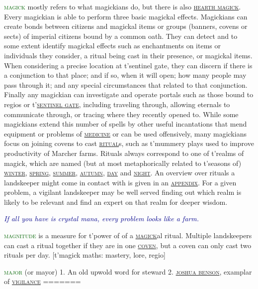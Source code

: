 \documentclass[twoside,11pt,b5paper,twocolumn]{scrbook}
\newcommand{\estcab}[1]{\textsc{\textcolor{marron}{#1}}}
\newcommand{\keyword}[1]{\textcolor{darkgreen}{#1}}
\renewcommand{\paragraph}[1]{\par\noindent\markboth{#1}{#1}\estcab{\keyword{#1}}\label{#1} }
\newcommand{\see}[1]{{\estcab{\hyperref[#1]{#1}}}}
\newcommand{\proverb}[1]{\par \textcolor{darkblue}{\itshape #1}}
\begin{document}
\paragraph{magick} mostly refers to what magickians do, but there is also \see{hearth magick}. Every magickian is able to perform three basic magickal effects. Magickians can create bonds between citizens and magickal items or groups (banners, covens or sects) of imperial citizens bound by a common oath. They can detect and to some extent identify magickal effects such as enchantments on items or individuals they consider, a ritual being cast in their presence, or magickal items. When considering a precise location at t'sentinel gate, they can discern if there is a conjunction to that place; and if so, when it will open; how many people may pass through it; and any special circumstances that related to that conjunction. Finally any magickian can investigate and operate portals such as those bound to regios or t'\see{sentinel gate}, including traveling through, allowing eternals to communicate through, or tracing where they recently opened to. While some magickians extend this number of spells by other useful incantations that mend equipment or problems of \see{medicine} or can be used offensively, many magickians focus on joining covens to cast \see{ritual}s, such as t'mummery plays used to improve productivity of Marcher farms. Rituals always correspond to one of t'realms of magick, which are named (but at most metaphorically related to t'seasons of) \see{winter}, \see{spring}, \see{summer}, \see{autumn}, \see{day} and \see{night}. An overview over rituals a landskeeper might come in contact with is given in an \see{appendix}. For a given problem, a vigilant landskeeper may be well served finding out which realm is likely to be relevant and find an expert on that realm for deeper wisdom. \proverb{If all you have is crystal mana, every problem looks like a farm.}
\paragraph{magnitude} is a measure for t'power of of a \see{magick}al ritual. Multiple landskeepers can cast a ritual together if they are in one \see{coven}, but a coven can only cast two rituals per day. [t'magick maths: mastery, lore, regio]
\paragraph{major} (or mayor) 1. An old upwold word for steward 2. \see{joshua benson}, examplar of \see{vigilance}
=======
\end{document}
